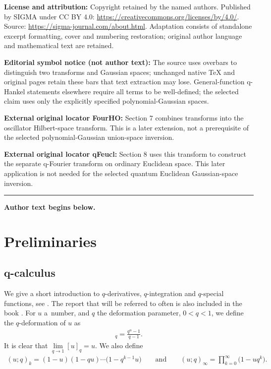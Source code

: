 \documentclass[11pt]{article}
\numberwithin{equation}{section}
\begin{document}
\noindent\textbf{License and attribution:} Copyright retained by the named authors. Published by SIGMA under CC BY 4.0: \url{https://creativecommons.org/licenses/by/4.0/}. Source: \url{https://sigma-journal.com/about.html}. Adaptation consists of standalone excerpt formatting, cover and numbering restoration; original author language and mathematical text are retained.\par
\noindent\textbf{Editorial symbol notice (not author text):} The source uses overbars to distinguish two transforms and Gaussian spaces; unchanged native TeX and original pages retain these bars that text extraction may lose. General-function q-Hankel statements elsewhere require all terms to be well-defined; the selected claim uses only the explicitly specified polynomial-Gaussian spaces.\par
\noindent\textbf{External original locator FourHO:} Section 7 combines transforms into the oscillator Hilbert-space transform. This is a later extension, not a prerequisite of the selected polynomial-Gaussian union-space inversion.\par
\noindent\textbf{External original locator qFeucl:} Section 8 uses this transform to construct the separate q-Fourier transform on ordinary Euclidean space. This later application is not needed for the selected quantum Euclidean Gaussian-space inversion.\par
\medskip\hrule\medskip\noindent\textbf{Author text begins below.}\par
\setcounter{section}{1}
\setcounter{subsection}{0}
\setcounter{subsubsection}{0}
\setcounter{equation}{0}
\section{Preliminaries}
\subsection[$q$-calculus]{$\boldsymbol{q}$-calculus}

We give a short introduction to $q$-derivatives, $q$-integration and $q$-special functions, see \cite{MR1052153, JACKSON, Koekoek, MR1448685}. The report \cite{Koekoek} that will be referred to often is also included in the book \cite{MR2656096}. For $u$ a~number, and $q$ the deformation parameter, $0<q<1$, we def\/ine the $q$-deformation of $u$ as
\begin{gather*}
[u]_q=\frac{q^u-1}{q-1}.
\end{gather*}
It is clear that $\lim\limits_{q\to 1}[u]_q=u$. We also def\/ine
\begin{gather*}
(u;q)_k=(1-u)(1-qu)\cdots\big(1-q^{k-1}u\big)\qquad \mbox{and}\qquad (u;q)_\infty=\prod_{k=0}^\infty \big(1-uq^k\big).
\end{gather*}
\end{document}
